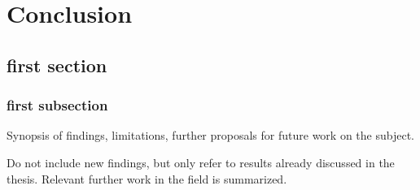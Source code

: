 \chapter{Conclusion} \label{ch:conclusion}

\section{first section}

\subsection{first subsection}

Synopsis of findings, limitations, further proposals for future work on the subject.

Do not include new findings, but only refer to results already discussed in the thesis. Relevant further work in the field is summarized.